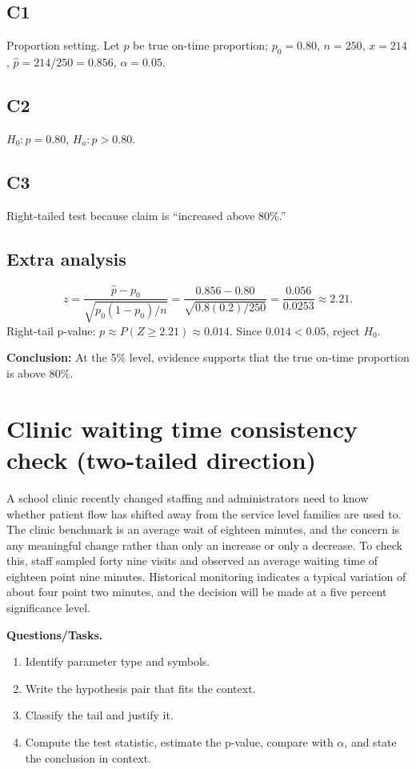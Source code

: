 \subsection*{C1}
Proportion setting. Let \(p\) be true on-time proportion; \(p_0=0.80\), \(n=250\), \(x=214\), \(\hat{p}=214/250=0.856\), \(\alpha=0.05\).

\subsection*{C2}
\(H_0:p=0.80\), \(H_a:p>0.80\).

\subsection*{C3}
Right-tailed test because claim is ``increased above 80\%.'' \RightTailGraph

\subsection*{Extra analysis}
\[
z=\frac{\hat p-p_0}{\sqrt{p_0(1-p_0)/n}}=\frac{0.856-0.80}{\sqrt{0.8(0.2)/250}}=\frac{0.056}{0.0253}\approx 2.21.
\]
Right-tail p-value: \(p\approx P(Z\ge 2.21)\approx 0.014\). Since \(0.014<0.05\), reject \(H_0\).

\textbf{Conclusion:} At the 5\% level, evidence supports that the true on-time proportion is above 80\%.


\section{Clinic waiting time consistency check (two-tailed direction)}
A school clinic recently changed staffing and administrators need to know whether patient flow has shifted away from the service level families are used to. The clinic benchmark is an average wait of eighteen minutes, and the concern is any meaningful change rather than only an increase or only a decrease. To check this, staff sampled forty nine visits and observed an average waiting time of eighteen point nine minutes. Historical monitoring indicates a typical variation of about four point two minutes, and the decision will be made at a five percent significance level.

\textbf{Questions/Tasks.}
\begin{enumerate}
    \item[(C1)] Identify parameter type and symbols.
    \item[(C2)] Write the hypothesis pair that fits the context.
    \item[(C3)] Classify the tail and justify it.
    \item[(Extra analysis)] Compute the test statistic, estimate the p-value, compare with \(\alpha\), and state the conclusion in context.
\end{enumerate}

